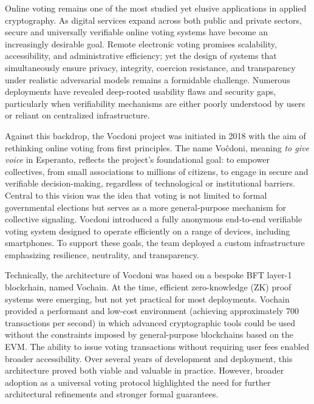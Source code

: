 
Online voting remains one of the most studied yet elusive applications in applied cryptography. As digital services expand across both public and private sectors, secure and universally verifiable online voting systems have become an increasingly desirable goal. Remote electronic voting promises scalability, accessibility, and administrative efficiency; yet the design of systems that simultaneously ensure privacy, integrity, coercion resistance, and transparency under realistic adversarial models remains a formidable challenge. 
Numerous deployments have revealed deep-rooted usability flaws and security gaps, particularly when verifiability mechanisms are either poorly understood by users or reliant on centralized infrastructure.

Against this backdrop, the Vocdoni project was initiated in 2018 with the aim of rethinking online voting from first principles. The name Voĉdoni, meaning \textit{to give voice} in Esperanto, reflects the project’s foundational goal: to empower collectives, from small associations to millions of citizens, to engage in secure and verifiable decision-making, regardless of technological or institutional barriers. Central to this vision was the idea that voting is not limited to formal governmental elections but serves as a more general-purpose mechanism for collective signaling. Vocdoni introduced a fully anonymous end-to-end verifiable voting system designed to operate efficiently on a range of devices, including smartphones. To support these goals, the team deployed a custom infrastructure emphasizing resilience, neutrality, and transparency.

Technically, the architecture of Vocdoni was based on a bespoke \ac{BFT} layer-1 blockchain, named Vochain. At the time, efficient zero-knowledge (ZK) proof systems were emerging, but not yet practical for most deployments. Vochain provided a performant and low-cost environment (achieving approximately 700 transactions per second) in which advanced cryptographic tools could be used without the constraints imposed by general-purpose blockchains based on the \ac{EVM}. The ability to issue voting transactions without requiring user fees enabled broader accessibility. Over several years of development and deployment, this architecture proved both viable and valuable in practice. However, broader adoption as a universal voting protocol highlighted the need for further architectural refinements and stronger formal guarantees.

